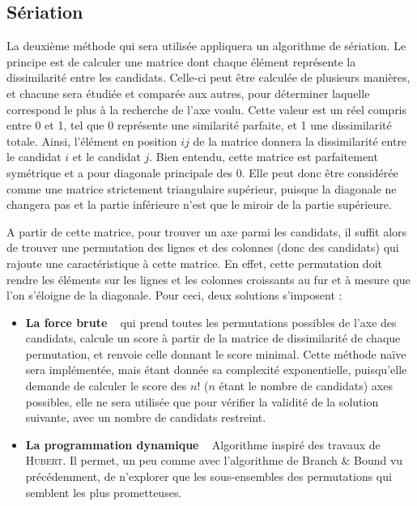 \documentclass[12pt]{article}
\begin{document}
\subsection*{S\'{e}riation}
La deuxième méthode qui sera utilisée appliquera un algorithme de sériation. Le principe est de calculer une matrice dont chaque élément représente la dissimilarité entre les candidats. Celle-ci peut être calculée de plusieurs manières, et chacune sera étudiée et comparée aux autres, pour déterminer laquelle correspond le plus à la recherche de l'axe voulu. Cette valeur est un réel compris entre 0 et 1, tel que 0 représente une similarité parfaite, et 1 une dissimilarité totale. Ainsi, l'élément en position $ij$ de la matrice donnera la dissimilarité entre le candidat $i$ et le candidat $j$. Bien entendu, cette matrice est parfaitement symétrique et a pour diagonale principale des 0. Elle peut donc être considérée comme une matrice strictement triangulaire supérieur, puisque la diagonale ne changera pas et la partie inférieure n'est que le miroir de la partie supérieure.

A partir de cette matrice, pour trouver un axe parmi les candidats, il suffit alors de trouver une permutation des lignes et des colonnes (donc des candidats) qui rajoute une caractéristique à cette matrice. En effet, cette permutation doit rendre les éléments sur les lignes et les colonnes croissants au fur et à mesure que l'on s'éloigne de la diagonale. Pour ceci, deux solutions s'imposent :\\
\begin{itemize}
	\item  \textbf{La force brute} ~  qui prend toutes les permutations possibles de l'axe des candidats, calcule un score à partir de la matrice de dissimilarité de chaque permutation, et renvoie celle donnant le score minimal. Cette méthode naïve sera implémentée, mais étant donnée sa complexité exponentielle, puisqu'elle demande de calculer le score des $n!$ ($n$ étant le nombre de candidats) axes possibles, elle ne sera utilisée que pour vérifier la validité de la solution suivante, avec un nombre de candidats restreint.\\
	\item \textbf{La programmation dynamique} ~ Algorithme inspiré des travaux de \textsc{Hubert}. Il permet, un peu comme avec l'algorithme de \og Branch \& Bound \fg{} vu précédemment, de n'explorer que les sous-ensembles des permutations qui semblent les plus prometteuses.
\end{itemize}
\end{document}
